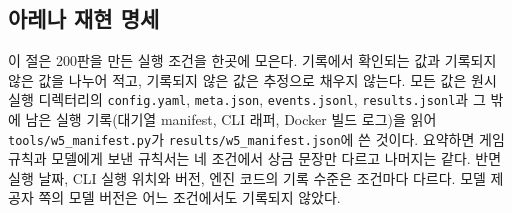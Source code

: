 \subsection{아레나 재현 명세}\label{val:w5-repro}

이 절은 200판을 만든 실행 조건을 한곳에 모은다. 기록에서 확인되는 값과 기록되지 않은 값을 나누어 적고, 기록되지 않은 값은 추정으로 채우지 않는다. 모든 값은 원시 실행 디렉터리의 \texttt{config.yaml}, \texttt{meta.json}, \texttt{events.jsonl}, \texttt{results.jsonl}과 그 밖에 남은 실행 기록(대기열 manifest, CLI 래퍼, Docker 빌드 로그)을 읽어 \texttt{tools/w5\_manifest.py}가 \texttt{results/w5\_manifest.json}에 쓴 것이다. 요약하면 게임 규칙과 모델에게 보낸 규칙서는 네 조건에서 상금 문장만 다르고 나머지는 같다. 반면 실행 날짜, CLI 실행 위치와 버전, 엔진 코드의 기록 수준은 조건마다 다르다. 모델 제공자 쪽의 모델 버전은 어느 조건에서도 기록되지 않았다.

